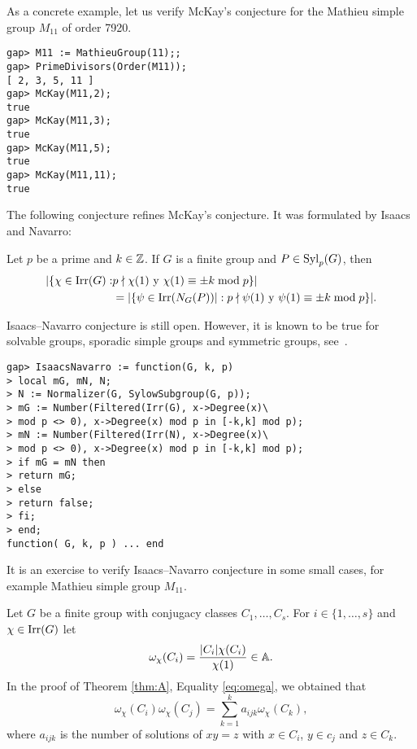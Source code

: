 As a concrete example, let us 
verify McKay's conjecture for the Mathieu simple group 
$M_{11}$ of order 7920. 

\begin{lstlisting}
gap> M11 := MathieuGroup(11);;
gap> PrimeDivisors(Order(M11));
[ 2, 3, 5, 11 ]
gap> McKay(M11,2);
true
gap> McKay(M11,3);
true
gap> McKay(M11,5);
true
gap> McKay(M11,11);
true
\end{lstlisting}

The following conjecture refines McKay's conjecture. It was
formulated by Isaacs and Navarro:

\begin{conjecture}
\label{conjecture:IsaacsNavarro}
Let $p$ be a prime and $k\in\mathbb{Z}$. 
If $G$ is a finite group and $P\in\mathrm{Syl}_p(G)$,
then
\begin{align*}
|\{\chi\in\operatorname{Irr}(G):&p\nmid \chi(1)\text{ y }\chi(1)\equiv\pm k\bmod p\}|\\
&=|\{\psi\in\operatorname{Irr}(N_G(P))|:p\nmid\psi(1)\text{ y }\psi(1)\equiv\pm k\bmod p\}|.
\end{align*}
\end{conjecture}

Isaacs--Navarro conjecture is still open. However, 
it is known to be true for solvable groups, 
sporadic simple groups and 
symmetric groups, see~\cite{MR1935849}. 

\begin{lstlisting}
gap> IsaacsNavarro := function(G, k, p)
> local mG, mN, N;
> N := Normalizer(G, SylowSubgroup(G, p));
> mG := Number(Filtered(Irr(G), x->Degree(x)\
> mod p <> 0), x->Degree(x) mod p in [-k,k] mod p);
> mN := Number(Filtered(Irr(N), x->Degree(x)\
> mod p <> 0), x->Degree(x) mod p in [-k,k] mod p);
> if mG = mN then
> return mG;
> else
> return false;
> fi;
> end;
function( G, k, p ) ... end
\end{lstlisting}

It is an exercise to verify Isaacs--Navarro conjecture in some
small cases, for example Mathieu simple group $M_{11}$. 

\label{commutators}

Let $G$ be a finite group with conjugacy classes $C_1,\dots,C_s$. For
$i\in\{1,\dots,s\}$ and $\chi\in\operatorname{Irr}(G)$ let  
\[
\omega_{\chi}(C_i)=\frac{|C_i|\chi(C_i)}{\chi(1)}\in\mathbb{A}.
\]
In the proof of Theorem \ref{thm:A}, Equality \eqref{eq:omega}, 
we obtained
that 
\begin{equation}
\label{eq:again_omega}
\omega_\chi(C_i)\omega_\chi(C_j)=\sum_{k=1}^ka_{ijk}\omega_{\chi}(C_k),
\end{equation}
where $a_{ijk}$ is the number of solutions 
of $xy=z$ with $x\in C_i$, $y\in c_j$ and $z\in C_k$. 

